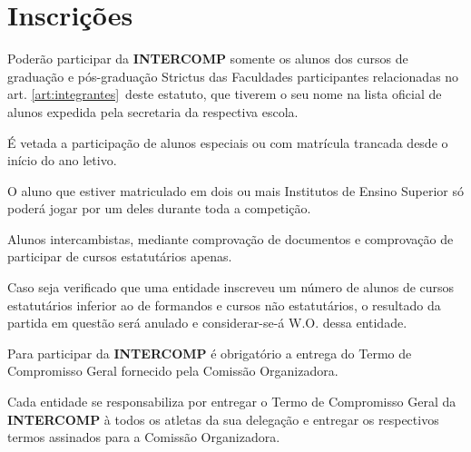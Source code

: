 
{\let\clearpage\relax \chapter{Inscrições}}

\begin{article}
	Poderão participar da \textbf{INTERCOMP} somente os alunos dos cursos de graduação e pós-graduação Strictus das Faculdades participantes relacionadas no art. \ref{art:integrantes}\ulo\ deste estatuto, que tiverem o seu nome na lista oficial de alunos expedida pela secretaria da respectiva escola.

	\begin{xparagraph}
		É vetada a participação de alunos especiais ou com matrícula trancada desde o início do ano letivo.
	\end{xparagraph}

	\begin{xparagraph}
		O aluno que estiver matriculado em dois ou mais Institutos de Ensino Superior só poderá jogar por um deles durante toda a competição.
	\end{xparagraph}

	\begin{xparagraph}
		Alunos intercambistas, mediante comprovação de documentos e comprovação de participar de cursos estatutários apenas.
	\end{xparagraph}
\end{article}

\begin{article}
	Caso seja verificado que uma entidade inscreveu um número de alunos de cursos estatutários inferior ao de formandos e cursos não estatutários, o resultado da partida em questão será anulado e considerar-se-á W.O. dessa entidade.

\end{article}

\begin{article}
	Para participar da \textbf{INTERCOMP} é obrigatório a entrega do Termo de Compromisso Geral fornecido pela Comissão Organizadora.

	\begin{xparagraph}
		Cada entidade se responsabiliza por entregar o Termo de Compromisso Geral da \textbf{INTERCOMP} à todos os atletas da sua delegação e entregar os respectivos termos assinados para a Comissão Organizadora.
	\end{xparagraph}
\end{article}

